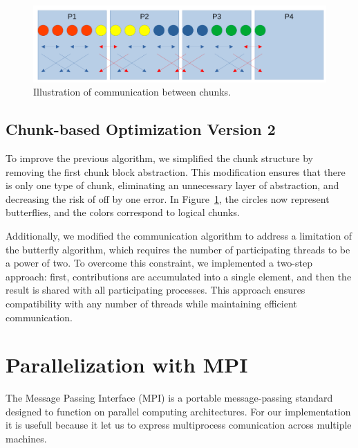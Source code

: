 \documentclass[10pt]{article}
\begin{document}
\begin{multicols}{2}
\begin{figure}[H]
  \includegraphics[scale=0.21]{img/chunks.png}
  \centering
  \caption{Illustration of communication between chunks.}
  \label{fig:chunks}
\end{figure}

\subsection*{Chunk-based Optimization Version 2}

To improve the previous algorithm, we simplified the chunk structure by removing the first chunk block abstraction.
This modification ensures that there is only one type of chunk, eliminating an unnecessary layer of abstraction, and decreasing the risk of off by one error.
In Figure~\ref{fig:chunks}, the circles now represent butterflies, and the colors correspond to logical chunks.

Additionally, we modified the communication algorithm to address a limitation of the butterfly algorithm, which requires the number of participating threads to be a power of two.
To overcome this constraint, we implemented a two-step approach: first, contributions are accumulated into a single element, and then the result is shared with all participating processes.
This approach ensures compatibility with any number of threads while maintaining efficient communication.





\section{Parallelization with MPI}

The Message Passing Interface (MPI) is a portable message-passing standard designed to function on parallel computing architectures.
For our implementation it is usefull because it let us to express multiprocess comunication across multiple machines.


\end{multicols}
\end{document}
